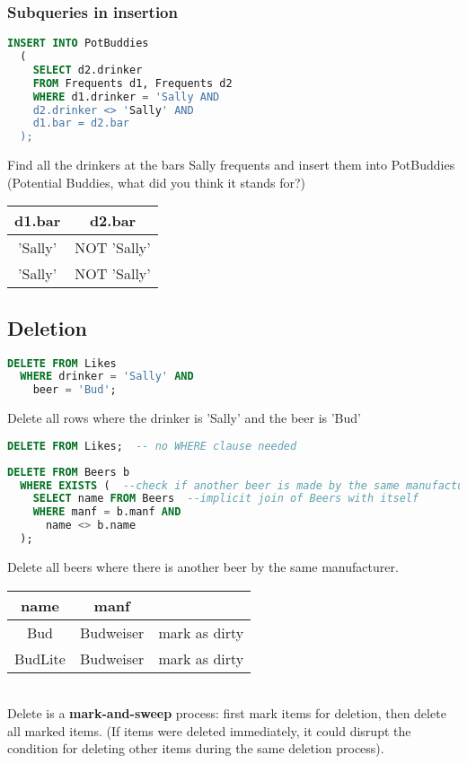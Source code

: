 \documentclass[12pt]{article}
\begin{document}
\subsubsection{Subqueries in insertion}
\begin{lstlisting}[language=sql,caption=insertion via subquery]
  INSERT INTO PotBuddies
  (
    SELECT d2.drinker
    FROM Frequents d1, Frequents d2
    WHERE d1.drinker = 'Sally AND
    d2.drinker <> 'Sally' AND
    d1.bar = d2.bar
  );
\end{lstlisting}
Find all the drinkers at the bars Sally frequents and insert them into
PotBuddies (Potential Buddies, what did you think it stands for?)\\
\begin{tabular}{|c|c|}
  \hline
  d1.bar & d2.bar\\
  \hline
  'Sally' & NOT 'Sally'\\
  'Sally' & NOT 'Sally'\\
  \hline
\end{tabular}

\subsection{Deletion}
\begin{lstlisting}[language=sql, caption=Sally no longer likes Bud]
  DELETE FROM Likes
  WHERE drinker = 'Sally' AND
    beer = 'Bud';
\end{lstlisting}
Delete all rows where the drinker is 'Sally' and the beer is 'Bud'
\begin{lstlisting}[language=sql,caption=clear out entire table]
  DELETE FROM Likes;  -- no WHERE clause needed
\end{lstlisting}

\begin{lstlisting}[language=sql,caption=delete with subquery]
  DELETE FROM Beers b
  WHERE EXISTS (  --check if another beer is made by the same manufacturer
    SELECT name FROM Beers  --implicit join of Beers with itself
    WHERE manf = b.manf AND
      name <> b.name
  );
\end{lstlisting}
Delete all beers where there is another beer by the same manufacturer.\\
\begin{tabular}{|c|c|c}
  \hline
  name & manf&\\
  \hline
  Bud & Budweiser & mark as dirty\\
  BudLite & Budweiser & mark as dirty\\
  \hline
\end{tabular}\\
Delete is a \textbf{mark-and-sweep} process: first mark items for deletion, then
delete all marked items. (If items were deleted immediately, it could disrupt
the condition for deleting other items during the same deletion process).
\end{document}
